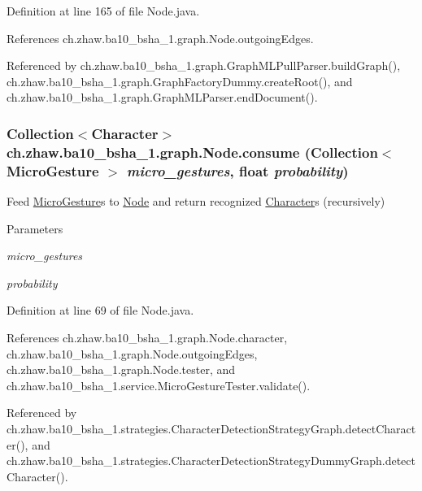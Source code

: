Definition at line 165 of file Node.java.

References ch.zhaw.ba10\_\-bsha\_\-1.graph.Node.outgoingEdges.

Referenced by ch.zhaw.ba10\_\-bsha\_\-1.graph.GraphMLPullParser.buildGraph(), ch.zhaw.ba10\_\-bsha\_\-1.graph.GraphFactoryDummy.createRoot(), and ch.zhaw.ba10\_\-bsha\_\-1.graph.GraphMLParser.endDocument().\hypertarget{classch_1_1zhaw_1_1ba10__bsha__1_1_1graph_1_1Node_a985b135e0ae7c0453985cd1dacdc4bc7}{
\subsubsection[{consume}]{\setlength{\rightskip}{0pt plus 5cm}Collection$<${\bf Character}$>$ ch.zhaw.ba10\_\-bsha\_\-1.graph.Node.consume (Collection$<$ {\bf MicroGesture} $>$ {\em micro\_\-gestures}, \/  float {\em probability})}}
\label{classch_1_1zhaw_1_1ba10__bsha__1_1_1graph_1_1Node_a985b135e0ae7c0453985cd1dacdc4bc7}
Feed \hyperlink{}{MicroGesture}s to \hyperlink{classch_1_1zhaw_1_1ba10__bsha__1_1_1graph_1_1Node}{Node} and return recognized \hyperlink{classch_1_1zhaw_1_1ba10__bsha__1_1_1Character}{Character}s (recursively)


\begin{DoxyParams}{Parameters}
\item[{\em micro\_\-gestures}]\item[{\em probability}]\end{DoxyParams}


Definition at line 69 of file Node.java.

References ch.zhaw.ba10\_\-bsha\_\-1.graph.Node.character, ch.zhaw.ba10\_\-bsha\_\-1.graph.Node.outgoingEdges, ch.zhaw.ba10\_\-bsha\_\-1.graph.Node.tester, and ch.zhaw.ba10\_\-bsha\_\-1.service.MicroGestureTester.validate().

Referenced by ch.zhaw.ba10\_\-bsha\_\-1.strategies.CharacterDetectionStrategyGraph.detectCharacter(), and ch.zhaw.ba10\_\-bsha\_\-1.strategies.CharacterDetectionStrategyDummyGraph.detectCharacter().

